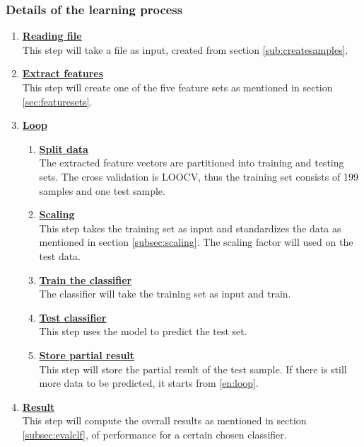 \documentclass[USenglish]{ifimaster}  %
\begin{document}
\subsubsection{Details of the learning process} \label{sub:learningprocess}
\begin{enumerate}
\item \textbf{\underline{Reading file}}
\\
This step will take a file as input, created from section \ref{sub:createsamples}.
		
\item \textbf{\underline{Extract features}}
\\
This step will create one of the five feature sets as mentioned in section \ref{sec:featuresets}.
		
\item \textbf{\underline{Loop}}
		
\begin{enumerate} 
\item \textbf{\underline{Split data}} \label{en:loop}
\\
The extracted feature vectors are partitioned into training and testing sets. The cross validation is LOOCV, thus the training set consists of 199 samples and one test sample.
			
\item \textbf{\underline{Scaling}}
\\
This step takes the training set as input and standardizes the data as mentioned in section \ref{subsec:scaling}. The scaling factor will used on the test data.
			
\item \textbf{\underline{Train the classifier}}
\\
The classifier will take the training set as input and train.
			
\item \textbf{\underline{Test classifier}} 
\\
This step uses the model to predict the test set.

\item \textbf{\underline{Store partial result}} 
\\
This step will store the partial result of the test sample. If there is still more data to be predicted, it starts from \ref{en:loop}.
\end{enumerate}	
		
\item \textbf{\underline{Result}}
\\
This step will compute the overall results as mentioned in section \ref{subsec:evalclf}, of performance for a certain chosen classifier. 
\end{enumerate}
	
\end{document}
